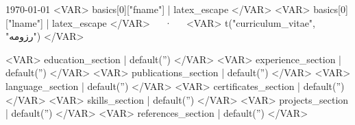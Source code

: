 \documentclass[11pt, a4paper]{./awesome-cv-rtl}
\begin{document}
\makecvheader

\makecvfooter
  {\today}
  {<VAR> basics[0]["fname"] | latex_escape </VAR> <VAR> basics[0]["lname"] | latex_escape </VAR>~~~·~~~<VAR> t("curriculum_vitae", "رزومه") </VAR>}
  {\thepage}


<VAR> education_section    | default('') </VAR>
<VAR> experience_section    | default('') </VAR>
<VAR> publications_section    | default('') </VAR>
<VAR> language_section    | default('') </VAR>
<VAR> certificates_section    | default('') </VAR>
<VAR> skills_section    | default('') </VAR>
<VAR> projects_section    | default('') </VAR>
<VAR> references_section    | default('') </VAR>
\end{document}
